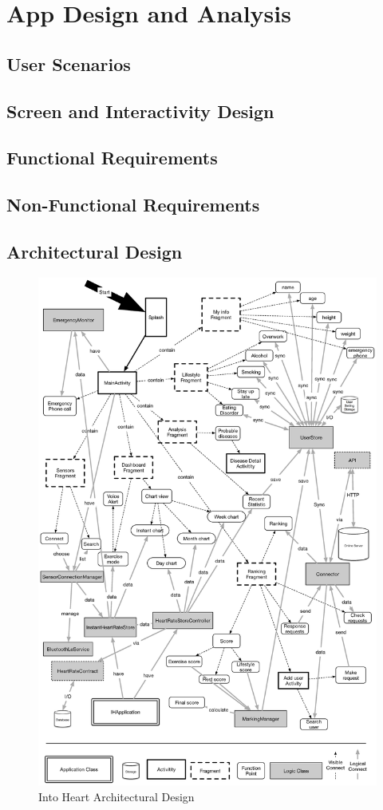 \documentclass[10pt,a4paper,final]{scrartcl}
\begin{document}
\section{App Design and Analysis}
\subsection{User Scenarios}
	
\subsection{Screen and Interactivity Design}
	
\subsection{Functional Requirements}
	
\subsection{Non-Functional Requirements}
	
\subsection{Architectural Design}
\begin{figure}[H]
\centering
\includegraphics[width=5.3in]{img/arch.eps}
\caption{Into Heart Architectural Design}
\end{figure}
\end{document}
